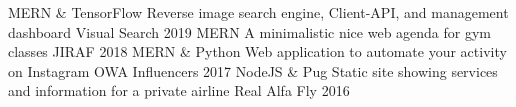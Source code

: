 \begin{cvhonors}
  \cvhonor
    {MERN \& TensorFlow}
    {Reverse image search engine, Client-API, and management dashboard}
    {Visual Search}
    {2019}
  \cvhonor
    {MERN}
    {A minimalistic nice web agenda for gym classes}
    {JIRAF}
    {2018}
  \cvhonor
    {MERN \& Python}
    {Web application to automate your activity on Instagram}
    {OWA Influencers}
    {2017}
  \cvhonor
    {NodeJS \& Pug}
    {Static site showing services and information for a private airline}
    {Real Alfa Fly}
    {2016}
\end{cvhonors}
